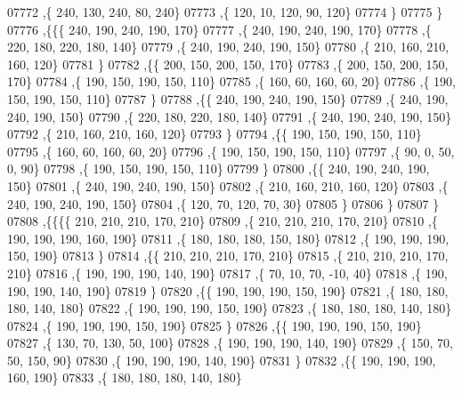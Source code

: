 \begin{DoxyCode}
07772     ,\{   240,   130,   240,    80,   240\}
07773     ,\{   120,    10,   120,    90,   120\}
07774     \}
07775    \}
07776   ,\{\{\{   240,   190,   240,   190,   170\}
07777     ,\{   240,   190,   240,   190,   170\}
07778     ,\{   220,   180,   220,   180,   140\}
07779     ,\{   240,   190,   240,   190,   150\}
07780     ,\{   210,   160,   210,   160,   120\}
07781     \}
07782    ,\{\{   200,   150,   200,   150,   170\}
07783     ,\{   200,   150,   200,   150,   170\}
07784     ,\{   190,   150,   190,   150,   110\}
07785     ,\{   160,    60,   160,    60,    20\}
07786     ,\{   190,   150,   190,   150,   110\}
07787     \}
07788    ,\{\{   240,   190,   240,   190,   150\}
07789     ,\{   240,   190,   240,   190,   150\}
07790     ,\{   220,   180,   220,   180,   140\}
07791     ,\{   240,   190,   240,   190,   150\}
07792     ,\{   210,   160,   210,   160,   120\}
07793     \}
07794    ,\{\{   190,   150,   190,   150,   110\}
07795     ,\{   160,    60,   160,    60,    20\}
07796     ,\{   190,   150,   190,   150,   110\}
07797     ,\{    90,     0,    50,     0,    90\}
07798     ,\{   190,   150,   190,   150,   110\}
07799     \}
07800    ,\{\{   240,   190,   240,   190,   150\}
07801     ,\{   240,   190,   240,   190,   150\}
07802     ,\{   210,   160,   210,   160,   120\}
07803     ,\{   240,   190,   240,   190,   150\}
07804     ,\{   120,    70,   120,    70,    30\}
07805     \}
07806    \}
07807   \}
07808  ,\{\{\{\{   210,   210,   210,   170,   210\}
07809     ,\{   210,   210,   210,   170,   210\}
07810     ,\{   190,   190,   190,   160,   190\}
07811     ,\{   180,   180,   180,   150,   180\}
07812     ,\{   190,   190,   190,   150,   190\}
07813     \}
07814    ,\{\{   210,   210,   210,   170,   210\}
07815     ,\{   210,   210,   210,   170,   210\}
07816     ,\{   190,   190,   190,   140,   190\}
07817     ,\{    70,    10,    70,   -10,    40\}
07818     ,\{   190,   190,   190,   140,   190\}
07819     \}
07820    ,\{\{   190,   190,   190,   150,   190\}
07821     ,\{   180,   180,   180,   140,   180\}
07822     ,\{   190,   190,   190,   150,   190\}
07823     ,\{   180,   180,   180,   140,   180\}
07824     ,\{   190,   190,   190,   150,   190\}
07825     \}
07826    ,\{\{   190,   190,   190,   150,   190\}
07827     ,\{   130,    70,   130,    50,   100\}
07828     ,\{   190,   190,   190,   140,   190\}
07829     ,\{   150,    70,    50,   150,    90\}
07830     ,\{   190,   190,   190,   140,   190\}
07831     \}
07832    ,\{\{   190,   190,   190,   160,   190\}
07833     ,\{   180,   180,   180,   140,   180\}

\end{DoxyCode}
